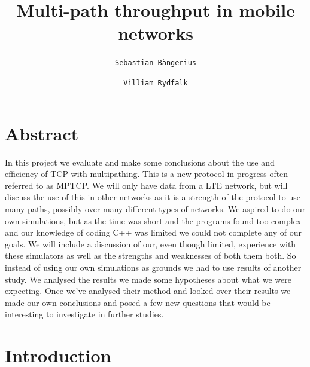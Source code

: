 \documentclass[11pt,twocolumn]{article}
\author{
  \texttt{Sebastian Bångerius}
  \and
  \texttt{Villiam Rydfalk}
}
\begin{document}

\title{Multi-path throughput in mobile networks}
\maketitle

\cleardoublepage


\section{Abstract}

In this project we evaluate and make some conclusions about the use and efficiency of TCP with multipathing. This is a new protocol in progress often referred to as MPTCP. We will only have data from a LTE network, but will discuss the use of this in other networks as it is a strength of the protocol to use many paths, possibly over many different types of networks. We aspired to do our own simulations, but as the time was short and the programs found too complex and our knowledge of coding C++ was limited we could not complete any of our goals. We will include a discussion of our, even though limited, experience with these simulators as well as the strengths and weaknesses of both them both. So instead of using our own simulations as grounds we had to use results of another study. \cite{MPTCP-LTE} We analysed the results we made some hypotheses about what we were expecting. Once we've analysed their method and looked over their results we made our own conclusions and posed a few new questions that would be interesting to investigate in further studies.



\section{Introduction}
\end{document}
